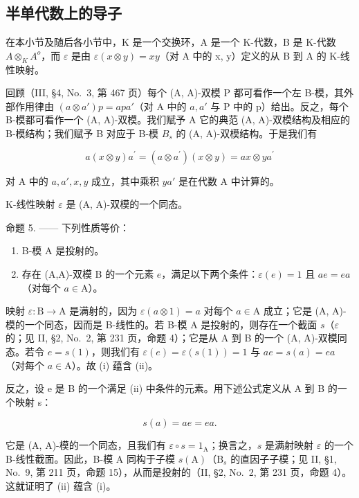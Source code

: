 \subsection{半单代数上的导子}

在本小节及随后各小节中，K 是一个交换环，A 是一个 K-代数，B 是 K-代数 \(A \otimes_{K} A^{o}\)，而 \(\varepsilon\) 是由 \(\varepsilon(x \otimes y) = xy\)（对 A 中的 x, y）定义的从 B 到 A 的 K-线性映射。

回顾（III, §4, No.~3, 第 467 页）每个 (A, A)-双模 P 都可看作一个左 B-模，其外部作用律由 \((a \otimes a')p = apa'\)（对 A 中的 \(a, a'\) 与 P 中的 p）给出。反之，每个 B-模都可看作一个 (A, A)-双模。我们赋予 A 它的典范 (A, A)-双模结构及相应的 B-模结构；我们赋予 B 对应于 B-模 \(B_s\) 的 (A, A)-双模结构。于是我们有

\[
a (x \otimes y) a ^ {\prime} = (a \otimes a ^ {\prime}) (x \otimes y) = a x \otimes y a ^ {\prime}
\]

对 A 中的 \(a, a', x, y\) 成立，其中乘积 \(ya'\) 是在代数 A 中计算的。

K-线性映射 \(\varepsilon\) 是 (A, A)-双模的一个同态。

命题 5. —— 下列性质等价：

\begin{enumerate}
\def\labelenumi{(\roman{enumi})}
\item
  B-模 A 是投射的。
\item
  存在 (A,A)-双模 B 的一个元素 \(e\)，满足以下两个条件：\(\varepsilon(e) = 1\) 且 \(ae = ea\)（对每个 \(a \in \mathrm{A}\)）。
\end{enumerate}

映射 \(\varepsilon: \mathrm{B} \to \mathrm{A}\) 是满射的，因为 \(\varepsilon(a \otimes 1) = a\) 对每个 \(a \in \mathrm{A}\) 成立；它是 (A, A)-模的一个同态，因而是 B-线性的。若 B-模 A 是投射的，则存在一个截面 \(s\)（\(\varepsilon\) 的；见 II, §2, No.~2, 第 231 页，命题 4）；它是从 A 到 B 的一个 (A, A)-双模同态。若令 \(e = s(1)\)，则我们有 \(\varepsilon(e) = \varepsilon(s(1)) = 1\) 与 \(ae = s(a) = ea\)（对每个 \(a \in \mathrm{A}\)）。故 (i) 蕴含 (ii)。

反之，设 e 是 B 的一个满足 (ii) 中条件的元素。用下述公式定义从 A 到 B 的一个映射 s：

\[
s (a) = a e = e a.\tag{1}
\]

它是 (A, A)-模的一个同态，且我们有 \(\varepsilon \circ s = 1_{\mathrm{A}}\)；换言之，\(s\) 是满射映射 \(\varepsilon\) 的一个 B-线性截面。因此，B-模 A 同构于子模 \(s(\mathrm{A})\)（\(\mathrm{B}_s\) 的直因子子模；见 II, §1, No.~9, 第 211 页，命题 15），从而是投射的（II, §2, No.~2, 第 231 页，命题 4）。这就证明了 (ii) 蕴含 (i)。

